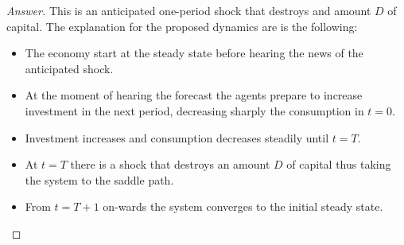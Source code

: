 \documentclass{article}
\theoremstyle{definition}
\begin{document}
\begin{proof}[Answer]

This is an anticipated one-period shock that destroys and amount $D$ of capital. The explanation for the proposed dynamics are is the following:

\begin{itemize}
    \item The economy start at the steady state before hearing the news of the anticipated shock.
    \item At the moment of hearing the forecast the agents prepare to increase investment in the next period, decreasing sharply the consumption in $t=0$. 
    \item Investment increases and consumption decreases steadily until $t=T$. 
    \item At $t=T$ there is a shock that destroys an amount $D$ of capital thus taking the system to the saddle path.
    \item From $t=T+1$ on-wards the system converges to the initial steady state.
\end{itemize}


\begin{figure}[h]
    \centering
    
    



\begin{tikzpicture}[x=0.75pt,y=0.75pt,yscale=-1,xscale=1]


\end{tikzpicture}
\end{figure}
\end{proof}
\end{document}

